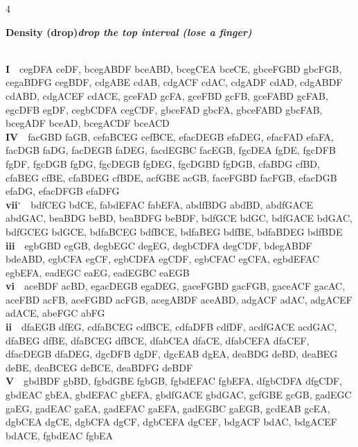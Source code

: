 \documentclass[letterpaper,12pt]{article}
\begin{document}
\begin{multicols}{4}
\noindent\colorbox{hdr4}{\begin{minipage}{\dimexpr\linewidth-2\fboxsep\relax}\raggedright\color{white}\bfseries Density (drop)\quad\normalfont\itshape drop the top interval (lose a finger)\end{minipage}}\\[0.1mm]
\noindent\hangindent=0.25in {\color{lhcol}\bfseries I}~~{\ttfamily cegDFA ceDF, bcegABDF bceABD, bcegCEA bceCE, gbceFGBD gbcFGB, cegaBDFG cegBDF, cdgABE cdAB, cdgACF cdAC, cdgADF cdAD, cdgABDF cdABD, cdgACEF cdACE, gceFAD gcFA, gceFBD gcFB, gceFABD gcFAB, egcDFB egDF, cegbCDFA cegCDF, gbceFAD gbcFA, gbceFABD gbcFAB, bcegADF bceAD, bcegACDF bceACD}\\[0.1mm]
\noindent\hangindent=0.25in {\color{lhcol}\bfseries IV}~~{\ttfamily facGBD faGB, cefaBCEG cefBCE, efacDEGB efaDEG, efacFAD efaFA, facDGB faDG, facDEGB faDEG, facdEGBC facEGB, fgcDEA fgDE, fgcDFB fgDF, fgcDGB fgDG, fgcDEGB fgDEG, fgcDGBD fgDGB, cfaBDG cfBD, cfaBEG cfBE, cfaBDEG cfBDE, acfGBE acGB, faceFGBD facFGB, efacDGB efaDG, efacDFGB efaDFG}\\[0.1mm]
\noindent\hangindent=0.25in {\color{lhcol}\bfseries vii$^\circ$}~~{\ttfamily bdfCEG bdCE, fabdEFAC fabEFA, abdfBDG abdBD, abdfGACE abdGAC, beaBDG beBD, beaBDFG beBDF, bdfGCE bdGC, bdfGACE bdGAC, bdfGCEG bdGCE, bdfaBCEG bdfBCE, bdfaBEG bdfBE, bdfaBDEG bdfBDE}\\[0.1mm]
\noindent\hangindent=0.25in {\color{lhcol}\bfseries iii}~~{\ttfamily egbGBD egGB, degbEGC degEG, degbCDFA degCDF, bdegABDF bdeABD, egbCFA egCF, egbCDFA egCDF, egbCFAC egCFA, egbdEFAC egbEFA, eadEGC eaEG, eadEGBC eaEGB}\\[0.1mm]
\noindent\hangindent=0.25in {\color{lhcol}\bfseries vi}~~{\ttfamily aceBDF acBD, egacDEGB egaDEG, gaceFGBD gacFGB, gaceACF gacAC, aceFBD acFB, aceFGBD acFGB, acegABDF aceABD, adgACF adAC, adgACEF adACE, abeFGC abFG}\\[0.1mm]
\noindent\hangindent=0.25in {\color{lhcol}\bfseries ii}~~{\ttfamily dfaEGB dfEG, cdfaBCEG cdfBCE, cdfaDFB cdfDF, acdfGACE acdGAC, dfaBEG dfBE, dfaBCEG dfBCE, dfabCEA dfaCE, dfabCEFA dfaCEF, dfacDEGB dfaDEG, dgcDFB dgDF, dgcEAB dgEA, deaBDG deBD, deaBEG deBE, deaBCEG deBCE, deaBDFG deBDF}\\[0.1mm]
\noindent\hangindent=0.25in {\color{lhcol}\bfseries V}~~{\ttfamily gbdBDF gbBD, fgbdGBE fgbGB, fgbdEFAC fgbEFA, dfgbCDFA dfgCDF, gbdEAC gbEA, gbdEFAC gbEFA, gbdfGACE gbdGAC, gcfGBE gcGB, gadEGC gaEG, gadEAC gaEA, gadEFAC gaEFA, gadEGBC gaEGB, gcdEAB gcEA, dgbCEA dgCE, dgbCFA dgCF, dgbCEFA dgCEF, bdgACF bdAC, bdgACEF bdACE, fgbdEAC fgbEA}\\[0.1mm]
\vspace{1.5mm}


\end{multicols}
\end{document}
